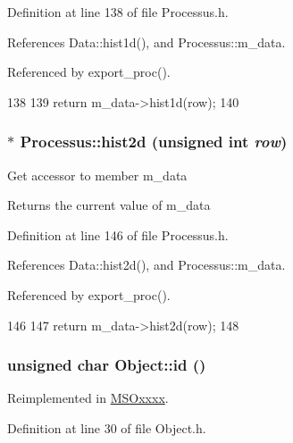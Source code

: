 Definition at line 138 of file Processus.h.

References Data::hist1d(), and Processus::m\_\-data.

Referenced by export\_\-proc().


\begin{DoxyCode}
138                                    {
139     return m_data->hist1d(row);
140   }
\end{DoxyCode}
\hypertarget{classProcessus_a73b5118cb5f2b5eaad33286183b86cfc}{
\subsubsection[{hist2d}]{$\ast$ Processus::hist2d (unsigned int {\em row})}}
\label{classProcessus_a73b5118cb5f2b5eaad33286183b86cfc}
Get accessor to member m\_\-data \begin{DoxyReturn}{Returns}
the current value of m\_\-data 
\end{DoxyReturn}


Definition at line 146 of file Processus.h.

References Data::hist2d(), and Processus::m\_\-data.

Referenced by export\_\-proc().


\begin{DoxyCode}
146                                    {
147     return m_data->hist2d(row);
148   }
\end{DoxyCode}
\hypertarget{classObject_af99145335cc61ff6e2798ea17db009d2}{
\subsubsection[{id}]{\setlength{\rightskip}{0pt plus 5cm}unsigned char Object::id ()}}
\label{classObject_af99145335cc61ff6e2798ea17db009d2}


Reimplemented in \hyperlink{classMSOxxxx_a0f14b23d31d8e7647184e99a89600cc3}{MSOxxxx}.

Definition at line 30 of file Object.h.

